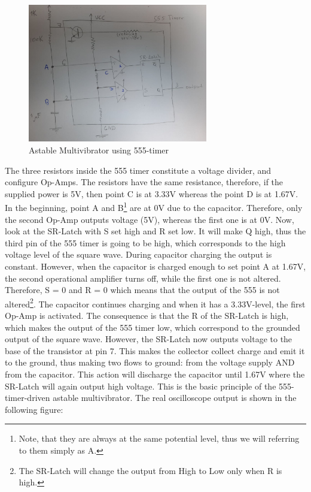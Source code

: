 \begin{figure}[H]
	\centering
	\includegraphics[width=0.7\textwidth]{img/astable}
	\caption{Astable Multivibrator using 555-timer}
	\label{fig:astable}
\end{figure}

The three resistors inside the 555 timer constitute a voltage divider, and configure Op-Amps. The resistors have the same resistance, therefore, if the supplied power is 5V, then point C is at 3.33V whereas the point D is at 1.67V. In the beginning, point A and B\footnote{Note, that they are always at the same potential level, thus we will referring to them simply as A.} are at 0V due to the capacitor. Therefore, only the second Op-Amp outputs voltage (5V), whereas the first one is at 0V. Now, look at the SR-Latch with S set high and R set low. It will make Q high, thus the third pin of the 555 timer is going to be high, which corresponds to the high voltage level of the square wave. During capacitor charging the output is constant. However, when the capacitor is charged enough to set point A at 1.67V, the second operational amplifier turns off, while the first one is not altered. Therefore, S = 0 and R = 0 which means that the output of the 555 is not altered\footnote{The SR-Latch will change the output from High to Low only when R is high.}. The capacitor continues charging and when it has a 3.33V-level, the first Op-Amp is activated. The consequence is that the R of the SR-Latch is high, which makes the output of the 555 timer low, which correspond to the grounded output of the square wave. However, the SR-Latch now outputs voltage to the base of the transistor at pin 7. This makes the collector collect charge and emit it to the ground, thus making two flows to ground: from the voltage supply AND from the capacitor. This action will discharge the capacitor until 1.67V where the SR-Latch will again output high voltage. This is the basic principle of the 555-timer-driven astable multivibrator. The real oscilloscope output is shown in the following figure: 

